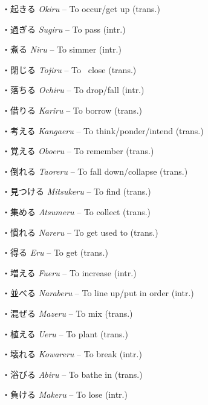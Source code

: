 \par{・起きる \emph{Okiru }– To occur\slash get up (trans.) }

\par{・過ぎる \emph{Sugiru }– To pass (intr.) }

\par{・煮る \emph{Niru }– To simmer (intr.) }

\par{・閉じる \emph{Tojiru }– To  close (trans.) }

\par{・落ちる \emph{Ochiru }– To drop\slash fall (intr.) }

\par{・借りる \emph{Kariru }– To borrow (trans.) }

\par{・考える \emph{Kangaeru }– To think\slash ponder\slash intend (trans.) }

\par{・覚える \emph{Oboeru }– To remember (trans.) }

\par{・倒れる \emph{Taoreru }– To fall down\slash collapse (trans.) }

\par{・見つける \emph{Mitsukeru }– To find (trans.) }

\par{・集める \emph{Atsumeru }– To collect (trans.) }

\par{・慣れる \emph{Nareru }– To get used to (trans.) }

\par{・得る \emph{Eru }– To get (trans.) }

\par{・増える \emph{Fueru }– To increase (intr.) }

\par{・並べる \emph{Naraberu }– To line up\slash put in order (intr.) }

\par{・混ぜる \emph{Mazeru }– To mix (trans.) }

\par{・植える \emph{Ueru }– To plant (trans.) }

\par{・壊れる \emph{Kowareru }– To break (intr.) }

\par{・浴びる \emph{Abiru }– To bathe in (trans.) }

\par{・負ける \emph{Makeru }– To lose (intr.) }


